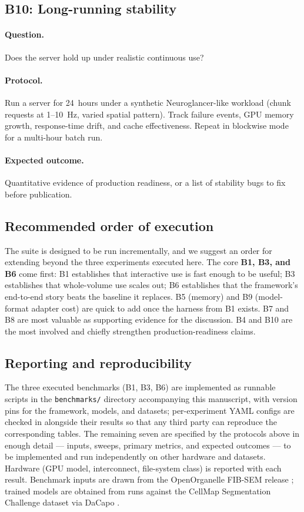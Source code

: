 \subsection*{B10: Long-running stability}

\paragraph{Question.} Does the server hold up under realistic continuous use?

\paragraph{Protocol.} Run a server for 24~hours under a synthetic Neuroglancer-like workload (chunk requests at 1--10~Hz, varied spatial pattern). Track failure events, GPU memory growth, response-time drift, and cache effectiveness. Repeat in blockwise mode for a multi-hour batch run.

\paragraph{Expected outcome.} Quantitative evidence of production readiness, or a list of stability bugs to fix before publication.

\subsection*{Recommended order of execution}

The suite is designed to be run incrementally, and we suggest an order for extending beyond the three experiments executed here. The core \textbf{B1, B3, and B6} come first: B1 establishes that interactive use is fast enough to be useful; B3 establishes that whole-volume use scales out; B6 establishes that the framework's end-to-end story beats the baseline it replaces. B5 (memory) and B9 (model-format adapter cost) are quick to add once the harness from B1 exists. B7 and B8 are most valuable as supporting evidence for the discussion. B4 and B10 are the most involved and chiefly strengthen production-readiness claims.

\subsection*{Reporting and reproducibility}

The three executed benchmarks (B1, B3, B6) are implemented as runnable scripts in the \texttt{benchmarks/} directory accompanying this manuscript, with version pins for the framework, models, and datasets; per-experiment YAML configs are checked in alongside their results so that any third party can reproduce the corresponding tables. The remaining seven are specified by the protocols above in enough detail --- inputs, sweeps, primary metrics, and expected outcomes --- to be implemented and run independently on other hardware and datasets. Hardware (GPU model, interconnect, file-system class) is reported with each result. Benchmark inputs are drawn from the OpenOrganelle FIB-SEM release \cite{Xu2021,OpenOrganelle}; trained models are obtained from runs against the CellMap Segmentation Challenge dataset \cite{CellMapChallenge} via DaCapo \cite{Patton2024,DaCapoRepo}.
